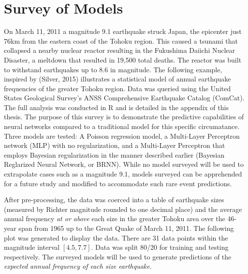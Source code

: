 \chapter{Survey of Models}

On March 11, 2011 a magnitude 9.1 earthquake struck Japan, the epicenter just 76km from the eastern coast of the Tohoku region.  This caused a tsunami that collapsed a nearby nuclear reactor resulting in the Fukushima Daiichi Nuclear Disaster, a meltdown that resulted in 19,500 total deaths.  The reactor was built to withstand earthquakes up to 8.6 in magnitude.  The following example, inspired by (Silver, 2015)\cite{silver2015signal} illustrates a statistical model of annual earthquake frequencies of the greater Tohoku region.
Data was queried using the United States Geological Survey's ANSS Comprehensive Earthquake Catalog (ComCat).  The full analysis was conducted in R and is detailed in the appendix of this thesis.  The purpose of this survey is to demonstrate the predictive capabilities of neural networks compared to a traditional model for this specific circumatance.  Three models are tested:
A Poisson regression model, a Multi-Layer Perceptron network (MLP) with no regularization, and a Multi-Layer Perceptron that employs Bayesian regularization in the manner described earlier (Bayesian Reglarized Neural Network, or BRNN). While no model surveyed will be used to extrapolate cases such as a magnitude 9.1, models surveyed can be apprehended for a future study and modified to accommodate such rare event predictions.

After pre-processing, the data was coerced into a table of earthquake sizes (measured by Richter magnitude rounded to one decimal place) and the average annual frequency \textit{at or above} each size in the greater Tohoku area over the 46-year span from 1965 up to the Great Quake of March 11, 2011. 
The following plot was generated to display the data. There are 31 data points within the magnitude interval $[4.5,7.7]$.  Data was split 80/20 for training and testing respectively.  The surveyed models will be used to generate predictions of the \textit{expected annual frequency of each size earthquake}.


